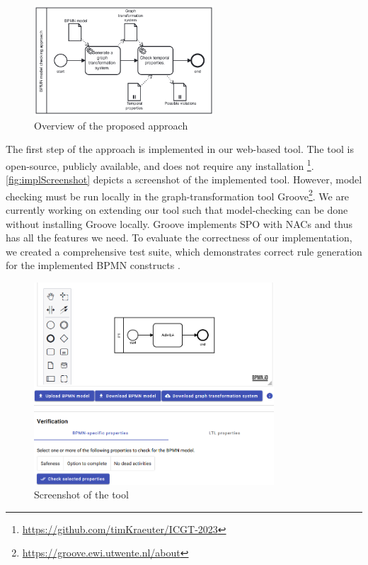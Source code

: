 \documentclass[runningheads]{llncs}
\begin{document}
\begin{figure}[ht]
    \centering
    \includegraphics[width=0.6\textwidth]{images/full-approach.pdf}
    \caption{Overview of the proposed approach}
    \label{fig:approach}
\end{figure}

The first step of the approach is implemented in our web-based tool.
The tool is open-source, publicly available, and does not require any installation \cite{krauterArtifactsICGT2023}\footnote{\url{https://github.com/timKraeuter/ICGT-2023}}.
\autoref{fig:implScreenshot} depicts a screenshot of the implemented tool.
However, model checking must be run locally in the graph-transformation tool Groove\footnote{\url{https://groove.ewi.utwente.nl/about}}.
We are currently working on extending our tool such that model-checking can be done without installing Groove locally.
Groove implements SPO with NACs and thus has all the features we need.
To evaluate the correctness of our implementation, we created a comprehensive test suite, which demonstrates correct rule generation for the implemented BPMN constructs \cite{krauterArtifactsICGT2023}.

\begin{figure}[ht]
    \centering
    \includegraphics[width=0.8\textwidth]{images/impl.png}
    \caption{Screenshot of the tool}
    \label{fig:implScreenshot}
\end{figure}
\end{document}
